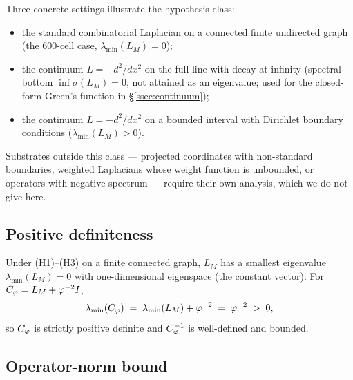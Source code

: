 Three concrete settings illustrate the hypothesis class:
\begin{itemize}\itemsep=2pt
\item the standard combinatorial Laplacian on a connected finite
  undirected graph (the 600-cell case, $\lambda_{\min}(L_M) = 0$);
\item the continuum $L = -d^{2}/dx^{2}$ on the full line with
  decay-at-infinity (spectral bottom $\inf \sigma(L_M) = 0$,
  not attained as an eigenvalue; used for the closed-form Green's
  function in \S\ref{ssec:continuum});
\item the continuum $L = -d^{2}/dx^{2}$ on a bounded interval
  with Dirichlet boundary conditions ($\lambda_{\min}(L_M) > 0$).
\end{itemize}
Substrates outside this class — projected coordinates with
non-standard boundaries, weighted Laplacians whose weight function
is unbounded, or operators with negative spectrum — require their
own analysis, which we do not give here.

\subsection{Positive definiteness}\label{ssec:positivity}

Under (H1)--(H3) on a finite connected graph, $L_M$ has a smallest
eigenvalue $\lambda_{\min}(L_M) = 0$ with one-dimensional
eigenspace (the constant vector). For $C_{\varphi} = L_M + \varphi^{-2} I$,
\[
\lambda_{\min}(C_{\varphi}) \;=\; \lambda_{\min}(L_M) + \varphi^{-2}
                    \;=\; \varphi^{-2} \;>\; 0,
\]
so $C_{\varphi}$ is strictly positive definite and $C_{\varphi}^{-1}$ is
well-defined and bounded.

\subsection{Operator-norm bound}\label{ssec:opnorm}

